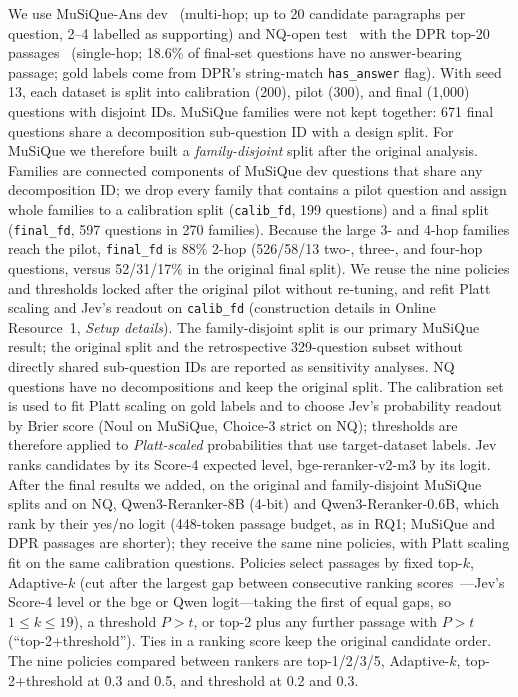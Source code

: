 We use MuSiQue-Ans dev~\cite{trivedi2022musique} (multi-hop; up to 20 candidate paragraphs per question, 2--4 labelled as supporting) and NQ-open test~\cite{kwiatkowski2019nq} with the DPR top-20 passages~\cite{karpukhin2020dpr} (single-hop; 18.6\% of final-set questions have no answer-bearing passage; gold labels come from DPR's string-match \texttt{has\_answer} flag).
With seed 13, each dataset is split into calibration (200), pilot (300), and final (1,000) questions with disjoint IDs. MuSiQue families were not kept together: 671 final questions share a decomposition sub-question ID with a design split.
For MuSiQue we therefore built a \emph{family-disjoint} split after the original analysis. Families are connected components of MuSiQue dev questions that share any decomposition ID; we drop every family that contains a pilot question and assign whole families to a calibration split (\texttt{calib\_fd}, 199 questions) and a final split (\texttt{final\_fd}, 597 questions in 270 families). Because the large 3- and 4-hop families reach the pilot, \texttt{final\_fd} is 88\% 2-hop (526/58/13 two-, three-, and four-hop questions, versus 52/31/17\% in the original final split). We reuse the nine policies and thresholds locked after the original pilot without re-tuning, and refit Platt scaling and Jev's readout on \texttt{calib\_fd} (construction details in Online Resource~1, \emph{Setup details}). The family-disjoint split is our primary MuSiQue result; the original split and the retrospective 329-question subset without directly shared sub-question IDs are reported as sensitivity analyses. NQ questions have no decompositions and keep the original split.
The calibration set is used to fit Platt scaling on gold labels and to choose Jev's probability readout by Brier score (Noul on MuSiQue, Choice-3 strict on NQ); thresholds are therefore applied to \emph{Platt-scaled} probabilities that use target-dataset labels.
Jev ranks candidates by its Score-4 expected level, bge-reranker-v2-m3 by its logit. After the final results we added, on the original and family-disjoint MuSiQue splits and on NQ, Qwen3-Reranker-8B (4-bit) and Qwen3-Reranker-0.6B, which rank by their yes/no logit (448-token passage budget, as in RQ1; MuSiQue and DPR passages are shorter); they receive the same nine policies, with Platt scaling fit on the same calibration questions. Policies select passages by fixed top-$k$, Adaptive-$k$ (cut after the largest gap between consecutive ranking scores~\cite{adaptivek2025}---Jev's Score-4 level or the bge or Qwen logit---taking the first of equal gaps, so $1\le k\le19$), a threshold $P>t$, or top-2 plus any further passage with $P>t$ (``top-2+threshold''). Ties in a ranking score keep the original candidate order. The nine policies compared between rankers are top-1/2/3/5, Adaptive-$k$, top-2+threshold at 0.3 and 0.5, and threshold at 0.2 and 0.3.
